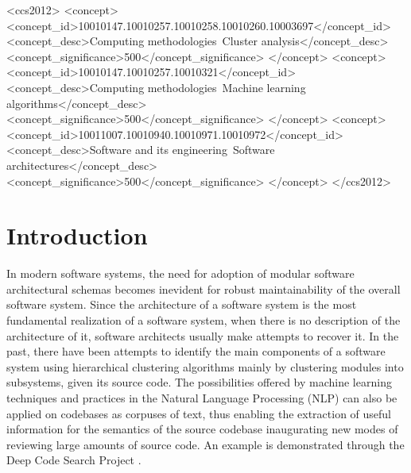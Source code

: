\documentclass[sigconf,review, anonymous]{acmart}
\begin{document}
%
%
\begin{CCSXML}
<ccs2012>
<concept>
<concept_id>10010147.10010257.10010258.10010260.10003697</concept_id>
<concept_desc>Computing methodologies~Cluster analysis</concept_desc>
<concept_significance>500</concept_significance>
</concept>
<concept>
<concept_id>10010147.10010257.10010321</concept_id>
<concept_desc>Computing methodologies~Machine learning algorithms</concept_desc>
<concept_significance>500</concept_significance>
</concept>
<concept>
<concept_id>10011007.10010940.10010971.10010972</concept_id>
<concept_desc>Software and its engineering~Software architectures</concept_desc>
<concept_significance>500</concept_significance>
</concept>
</ccs2012>
\end{CCSXML}

%



\maketitle

\section{Introduction}




In modern software systems, the need for adoption of modular software architectural schemas 
becomes inevident for robust maintainability of the overall software system.
Since the architecture of a software system is the most fundamental realization of a 
software system, when there is no description of the architecture of it, software 
architects usually make attempts to recover it. In the past, there have been attempts to 
identify the main components of a software system using hierarchical clustering 
algorithms \cite{maqbool_overview, limbo} mainly by clustering modules into subsystems, given 
its source code.    
The possibilities offered by machine learning techniques and practices in the Natural Language Processing (NLP) 
can also be applied on codebases as corpuses of text, thus enabling 
the extraction of useful information for the semantics of the source codebase 
inaugurating new modes of reviewing large amounts of source code.
An example is demonstrated through the Deep Code Search Project \cite{deepcodesearch} .
\end{document}
